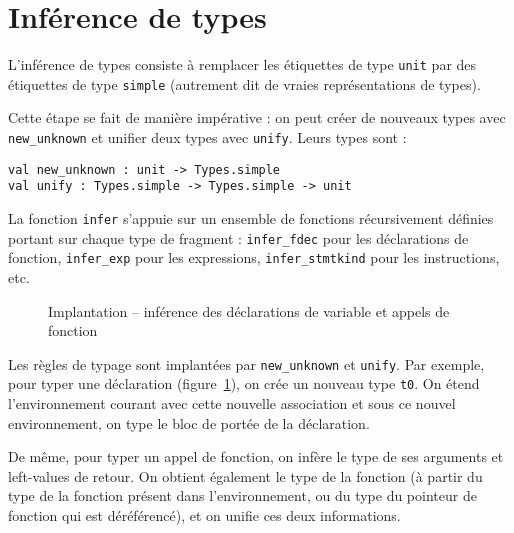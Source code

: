 \section{Inférence de types}

L'inférence de types consiste à remplacer les étiquettes de type \texttt{unit}
par des étiquettes de type \texttt{simple} (autrement dit de vraies
représentations de types).

Cette étape se fait de manière impérative : on peut créer de nouveaux types avec
\texttt{new\_unknown} et unifier deux types
avec \texttt{unify}. Leurs types sont :

\begin{verbatim}
val new_unknown : unit -> Types.simple
val unify : Types.simple -> Types.simple -> unit
\end{verbatim}

La fonction \texttt{infer} s'appuie sur un ensemble de fonctions récursivement
définies portant sur chaque type de fragment : \texttt{infer\_fdec} pour les
déclarations de fonction, \texttt{infer\_exp} pour les expressions,
\texttt{infer\_stmtkind} pour les instructions, etc.

\begin{figure}



\caption{Implantation -- inférence des déclarations de variable et appels de
         fonction}

\label{fig:implem-unif-stmt}
\end{figure}


Les règles de typage sont implantées par \texttt{new\_unknown} et
\texttt{unify}. Par exemple, pour typer une déclaration
(figure~\ref{fig:implem-unif-stmt}), on crée un nouveau
type \texttt{t0}. On étend l'environnement courant avec cette nouvelle
association et sous ce nouvel environnement, on type le bloc de portée de la
déclaration.

De même, pour typer un appel de fonction, on infère le type de ses arguments et
left-values de retour. On obtient également le type de la fonction (à partir du
type de la fonction présent dans l'environnement, ou du type du pointeur de
fonction qui est déréférencé), et on unifie ces deux informations.

